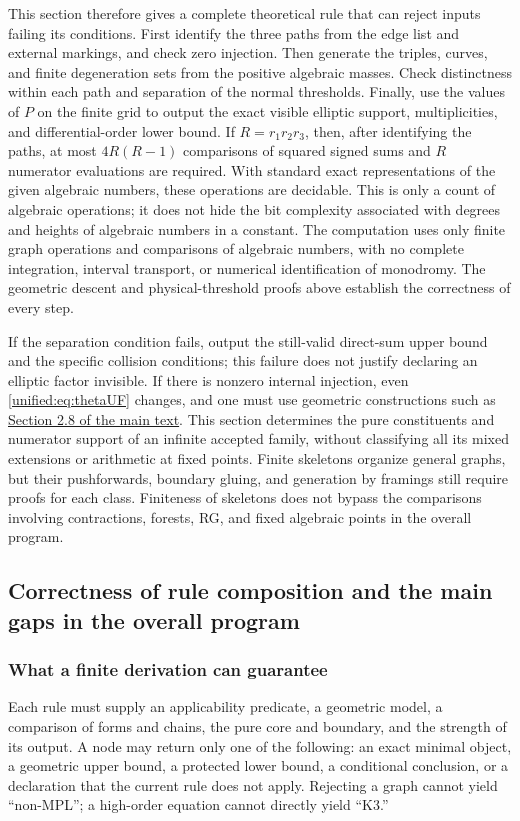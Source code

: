 \documentclass[11pt,a4paper,oneside]{article}
\theoremstyle{plain}
\theoremstyle{definition}
\theoremstyle{remark}
\numberwithin{equation}{section}
\newcommand{\otherref}[2]{\href{#1.pdf}{#2}}
\begin{document}
This section therefore gives a complete theoretical rule that can reject inputs failing its conditions.
First identify the three paths from the edge list and external markings, and check zero injection.
Then generate the triples, curves, and finite degeneration sets from the positive algebraic masses.
Check distinctness within each path and separation of the normal thresholds.
Finally, use the values of $P$ on the finite grid to output the exact visible elliptic support, multiplicities, and differential-order lower bound.
If $R=r_1r_2r_3$, then, after identifying the paths, at most $4R(R-1)$ comparisons of squared signed sums
and $R$ numerator evaluations are required. With standard exact representations of the given algebraic numbers, these operations are decidable.
This is only a count of algebraic operations; it does not hide the bit complexity associated with degrees and heights of algebraic numbers in a constant.
The computation uses only finite graph operations and comparisons of algebraic numbers, with no complete integration, interval transport, or numerical identification of monodromy.
The geometric descent and physical-threshold proofs above establish the correctness of every step.

If the separation condition fails, output the still-valid direct-sum upper bound and the specific collision conditions;
this failure does not justify declaring an elliptic factor invisible. If there is nonzero internal injection, even
\eqref{unified:eq:thetaUF} changes, and one must use geometric constructions such as \otherref{feynman_periods_long_paper_en}{Section 2.8 of the main text}.
This section determines the pure constituents and numerator support of an infinite accepted family, without classifying all its mixed extensions or arithmetic at fixed points.
Finite skeletons organize general graphs, but their pushforwards, boundary gluing, and generation by framings
still require proofs for each class. Finiteness of skeletons does not bypass the comparisons involving contractions, forests, RG, and fixed algebraic points in the overall program.



\subsection{Correctness of rule composition and the main gaps in the overall program}
\subsubsection{What a finite derivation can guarantee}
Each rule must supply an applicability predicate, a geometric model, a comparison of forms and chains, the pure core and boundary,
and the strength of its output. A node may return only one of the following:
an exact minimal object, a geometric upper bound, a protected lower bound, a conditional conclusion, or a declaration that the current rule does not apply.
Rejecting a graph cannot yield ``non-MPL''; a high-order equation cannot directly yield ``K3.''
\end{document}
